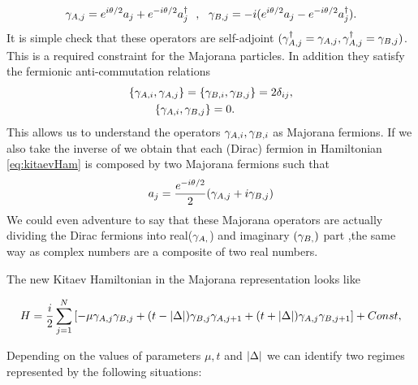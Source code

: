 \begin{equation}
\gamma_{A,j} = e^{i\theta /2}a_j+ e^{-i\theta/2 } a^{\dagger}_j \ \ , \ \ \gamma_{B,j} = -i(e^{i\theta /2}a_j - e^{-i\theta/2} a^{\dagger}_j).
\label{eq:MajoranaTrans}
\end{equation}
It is simple check that these operators are self-adjoint $(\gamma_{A,j}^\dagger = \gamma_{A,j}, \gamma_{A,j}^\dagger = \gamma_{B,j})$. This is a required constraint for the Majorana particles. In addition they satisfy the fermionic anti-commutation relations
\begin{equation}
\begin{aligned}
\{\gamma_{A,i}, \gamma_{A,j}\} = \{ & \gamma_{B,i} , \gamma_{B,j}\} = 2\delta_{ij}  ,\\ 
  \{\gamma_{A,i}, \gamma_{B,j} & \} =0.
\end{aligned} 
\label{MajoranaRel}
\end{equation} 
This allows us to understand the operators $\gamma_{A,i} , \gamma_{B,i}$ as Majorana fermions. If we also take the inverse of  we obtain that each  (Dirac) fermion in Hamiltonian \eqref{eq:kitaevHam} is composed by two Majorana fermions such that 
$$a_j = \frac{e^{-i\theta/2}}{2}(\gamma_{A,j}+ i\gamma_{B,j})$$
We could even adventure to say that these Majorana operators are actually dividing the Dirac fermions into real($\gamma_{A,}$) and imaginary $(\gamma_{B,})$ part ,the same way as complex numbers are a composite of two real numbers. 

The new Kitaev Hamiltonian in the Majorana representation looks like 

\begin{equation}
H = \frac{i}{2} \sum_{j=1}^N \left[ -\mu \gamma_{A,j}\gamma_{B,j}  + (t- \vert \Delta \vert) \gamma_{B,j}\gamma_{A,j+1} + (t+ \vert \Delta \vert) \gamma_{A,j}\gamma_{B,j+1} \right]+Const,\label{eq:HamMajorana}
\end{equation}

Depending on the values of parameters $\mu, t$ and $\vert \Delta \vert$ we can identify two regimes represented by the following situations:



